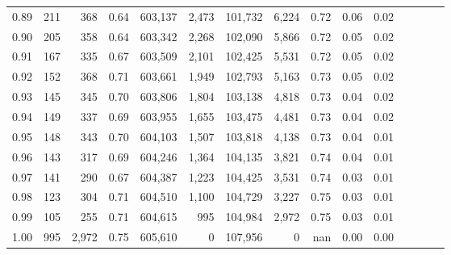 \begin{tabular}{rrrcrrrrrrrrrrr}
0.89 &     211 &    368 &                                       0.64 &  603,137 &    2,473 &  101,732 &    6,224 &  0.72 &  0.06 &                         0.02 \\
0.90 &     205 &    358 &                                       0.64 &  603,342 &    2,268 &  102,090 &    5,866 &  0.72 &  0.05 &                         0.02 \\
0.91 &     167 &    335 &                                       0.67 &  603,509 &    2,101 &  102,425 &    5,531 &  0.72 &  0.05 &                         0.02 \\
0.92 &     152 &    368 &                                       0.71 &  603,661 &    1,949 &  102,793 &    5,163 &  0.73 &  0.05 &                         0.02 \\
0.93 &     145 &    345 &                                       0.70 &  603,806 &    1,804 &  103,138 &    4,818 &  0.73 &  0.04 &                         0.02 \\
0.94 &     149 &    337 &                                       0.69 &  603,955 &    1,655 &  103,475 &    4,481 &  0.73 &  0.04 &                         0.02 \\
0.95 &     148 &    343 &                                       0.70 &  604,103 &    1,507 &  103,818 &    4,138 &  0.73 &  0.04 &                         0.01 \\
0.96 &     143 &    317 &                                       0.69 &  604,246 &    1,364 &  104,135 &    3,821 &  0.74 &  0.04 &                         0.01 \\
0.97 &     141 &    290 &                                       0.67 &  604,387 &    1,223 &  104,425 &    3,531 &  0.74 &  0.03 &                         0.01 \\
0.98 &     123 &    304 &                                       0.71 &  604,510 &    1,100 &  104,729 &    3,227 &  0.75 &  0.03 &                         0.01 \\
0.99 &     105 &    255 &                                       0.71 &  604,615 &      995 &  104,984 &    2,972 &  0.75 &  0.03 &                         0.01 \\
1.00 &     995 &  2,972 &                                       0.75 &  605,610 &        0 &  107,956 &        0 &   nan &  0.00 &                         0.00 \\
\bottomrule
\end{tabular}
